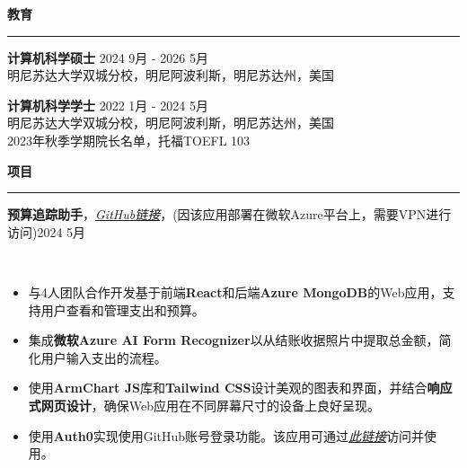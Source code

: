 \documentclass{cv}
\newcommand*{\labelfont}{\fontfamily{bch}\selectfont}
\begin{document}
{ {\textbf{教育}}}\vspace*{-6pt}\\
\rule{\textwidth}{0.4pt}
{\labelfont \textbf{计算机科学硕士} \hspace{12.7cm} 2024 9月 - 2026 5月}\\
{\small 明尼苏达大学双城分校，明尼阿波利斯，明尼苏达州，美国
\hspace{5.5cm}
}
\vspace*{3pt}

{\labelfont \textbf{计算机科学学士} \hspace{12.7cm} 2022 1月 - 2024 5月}\\
{\small 明尼苏达大学双城分校，明尼阿波利斯，明尼苏达州，美国 \hspace{5.5cm}
\vspace{1.5pt}\\
\small 2023年秋季学期院长名单，托福TOEFL 103 \hspace{5.5cm}
}

\vspace*{5pt}
{ {\textbf{项目}}}\vspace*{-6pt}\\
\rule{\textwidth}{0.4pt}
{\labelfont \textbf{预算追踪助手}，\textit{\href{https://github.com/csci5117s24/project-2-html-heroes-2}{GitHub链接}}，(因该应用部署在微软Azure平台上，需要VPN进行访问)\hspace*{2.8cm}\hspace{2.4mm}\hspace{1.5mm}2024 5月}
{
\small
\vspace{-15pt}\\
\begin{itemize}
\setlength\itemsep{1pt}
    \item 与4人团队合作开发基于前端\textbf{React}和后端\textbf{Azure MongoDB}的Web应用，支持用户查看和管理支出和预算。
    \item 集成\textbf{微软Azure AI Form Recognizer}以从结账收据照片中提取总金额，简化用户输入支出的流程。
    \item 使用\textbf{ArmChart JS}库和\textbf{Tailwind CSS}设计美观的图表和界面，并结合\textbf{响应式网页设计}，确保Web应用在不同屏幕尺寸的设备上良好呈现。
    \item 使用\textbf{Auth0}实现使用GitHub账号登录功能。该应用可通过\textit{\href{https://nice-ocean-02cf72b0f.5.azurestaticapps.net}{此链接}}访问并使用。
\end{itemize}
}
\end{document}
